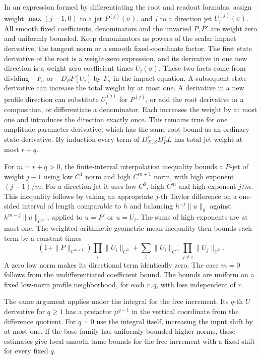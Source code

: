 \documentclass[11pt]{article}
\begin{document}
In an expression formed by differentiating the root and readout formulas, assign
weight \(\max(j-1,0)\) to a jet \(P^{(j)}(\sigma)\), and \(j\) to a direction
jet \(U_i^{(j)}(\sigma)\). All smooth fixed coefficients, denominators and the
unvaried \(P,P'\) are weight zero and uniformly bounded. Keep denominators as
powers of the scalar impact derivative, the tangent norm or a smooth
fixed-coordinate factor. The first state derivative of the root is a weight-zero
expression, and its derivative in one new direction is a weight-zero coefficient
times \(U_i(\sigma)\). These two facts come from dividing \(-F_{a}\) or
\(-D_PF[U_i]\) by \(F_\sigma\) in the impact equation. A subsequent state
derivative can increase the total weight by at most one. A derivative in a new
profile direction can substitute \(U_i^{(j)}\) for \(P^{(j)}\), or add the root
derivative in a composition, or differentiate a denominator. Each increases the
weight by at most one and introduces the direction exactly once. This remains
true for one amplitude-parameter derivative, which has the same root bound as an
ordinary state derivative. By induction every term of \(D_{X,Z}^rD_P^q L\) has
total jet weight at most \(r+q\).

For \(m=r+q>0\), the finite-interval interpolation inequality bounds a \(P\)-jet
of weight \(j-1\) using low \(C^1\) norm and high \(C^{m+1}\) norm, with high
exponent \((j-1)/m\). For a direction jet it uses low \(C^0\), high \(C^m\) and
high exponent \(j/m\). This inequality follows by taking an appropriate \(j\)-th
Taylor difference on a one-sided interval of length comparable to \(h\) and
balancing \(h^{-j}\|u\|_0\) against \(h^{m-j}\|u\|_{C^m}\), applied to \(u=P'\)
or \(u=U_i\). The sums of high exponents are at most one. The weighted
arithmetic-geometric mean inequality then bounds each term by a constant times
\[
 (1+\|P\|_{C^{m+1}})\prod_i\|U_i\|_{C^0}
 +\sum_i\|U_i\|_{C^m}\prod_{j\ne i}\|U_j\|_{C^0}.
\] A zero low norm makes its directional term identically zero. The case \(m=0\)
follows from the undifferentiated coefficient bound. The bounds are uniform on a
fixed low-norm profile neighborhood, for each \(r,q\), with loss independent of
\(r\).

The same argument applies under the integral for the free increment. Its
\(q\)-th \(U\) derivative for \(q\geq1\) has a prefactor \(\mu^{q-1}\) in the
vertical coordinate from the difference quotient. For \(q=0\) use the integral
itself, increasing the input shift by at most one. If the base family has
uniformly bounded higher norms, these estimates give local smooth tame bounds
for the free increment with a fixed shift for every fixed \(q\).
\end{document}
